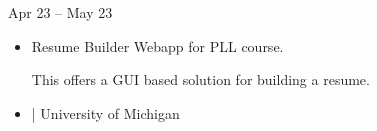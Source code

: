 \documentclass[10pt,a4paper,ragged2e,withhyper]{altacv}
\begin{document}
\begin{paracol}{2}
                    {\cvreference{| \faGlobe}{}}
                    {Apr 23 -- May 23}{}
                \begin{itemize}
                        \item Resume Builder Webapp for PLL course.

This offers a GUI based solution for building a resume.
                \end{itemize}
                \divider
        
        \begin{samepage}
            \begin{itemize}
                    \item {}
                            {| University of Michigan }{}{}
            \end{itemize}
        \end{samepage}

            \divider
    \end{paracol}
\end{document}
